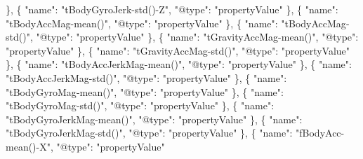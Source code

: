 \documentclass[
]{article}
\newenvironment{Shaded}{\begin{snugshade}}{\end{snugshade}}
\newcommand{\DataTypeTok}[1]{\textcolor[rgb]{0.13,0.29,0.53}{#1}}
\newcommand{\FunctionTok}[1]{\textcolor[rgb]{0.00,0.00,0.00}{#1}}
\newcommand{\OtherTok}[1]{\textcolor[rgb]{0.56,0.35,0.01}{#1}}
\newcommand{\StringTok}[1]{\textcolor[rgb]{0.31,0.60,0.02}{#1}}
\begin{document}
\begin{Shaded}
\begin{Highlighting}[]
    \FunctionTok{\}}\OtherTok{,}
    \FunctionTok{\{}
      \DataTypeTok{"name"}\FunctionTok{:} \StringTok{"tBodyGyroJerk{-}std(){-}Z"}\FunctionTok{,}
      \DataTypeTok{"@type"}\FunctionTok{:} \StringTok{"propertyValue"}
    \FunctionTok{\}}\OtherTok{,}
    \FunctionTok{\{}
      \DataTypeTok{"name"}\FunctionTok{:} \StringTok{"tBodyAccMag{-}mean()"}\FunctionTok{,}
      \DataTypeTok{"@type"}\FunctionTok{:} \StringTok{"propertyValue"}
    \FunctionTok{\}}\OtherTok{,}
    \FunctionTok{\{}
      \DataTypeTok{"name"}\FunctionTok{:} \StringTok{"tBodyAccMag{-}std()"}\FunctionTok{,}
      \DataTypeTok{"@type"}\FunctionTok{:} \StringTok{"propertyValue"}
    \FunctionTok{\}}\OtherTok{,}
    \FunctionTok{\{}
      \DataTypeTok{"name"}\FunctionTok{:} \StringTok{"tGravityAccMag{-}mean()"}\FunctionTok{,}
      \DataTypeTok{"@type"}\FunctionTok{:} \StringTok{"propertyValue"}
    \FunctionTok{\}}\OtherTok{,}
    \FunctionTok{\{}
      \DataTypeTok{"name"}\FunctionTok{:} \StringTok{"tGravityAccMag{-}std()"}\FunctionTok{,}
      \DataTypeTok{"@type"}\FunctionTok{:} \StringTok{"propertyValue"}
    \FunctionTok{\}}\OtherTok{,}
    \FunctionTok{\{}
      \DataTypeTok{"name"}\FunctionTok{:} \StringTok{"tBodyAccJerkMag{-}mean()"}\FunctionTok{,}
      \DataTypeTok{"@type"}\FunctionTok{:} \StringTok{"propertyValue"}
    \FunctionTok{\}}\OtherTok{,}
    \FunctionTok{\{}
      \DataTypeTok{"name"}\FunctionTok{:} \StringTok{"tBodyAccJerkMag{-}std()"}\FunctionTok{,}
      \DataTypeTok{"@type"}\FunctionTok{:} \StringTok{"propertyValue"}
    \FunctionTok{\}}\OtherTok{,}
    \FunctionTok{\{}
      \DataTypeTok{"name"}\FunctionTok{:} \StringTok{"tBodyGyroMag{-}mean()"}\FunctionTok{,}
      \DataTypeTok{"@type"}\FunctionTok{:} \StringTok{"propertyValue"}
    \FunctionTok{\}}\OtherTok{,}
    \FunctionTok{\{}
      \DataTypeTok{"name"}\FunctionTok{:} \StringTok{"tBodyGyroMag{-}std()"}\FunctionTok{,}
      \DataTypeTok{"@type"}\FunctionTok{:} \StringTok{"propertyValue"}
    \FunctionTok{\}}\OtherTok{,}
    \FunctionTok{\{}
      \DataTypeTok{"name"}\FunctionTok{:} \StringTok{"tBodyGyroJerkMag{-}mean()"}\FunctionTok{,}
      \DataTypeTok{"@type"}\FunctionTok{:} \StringTok{"propertyValue"}
    \FunctionTok{\}}\OtherTok{,}
    \FunctionTok{\{}
      \DataTypeTok{"name"}\FunctionTok{:} \StringTok{"tBodyGyroJerkMag{-}std()"}\FunctionTok{,}
      \DataTypeTok{"@type"}\FunctionTok{:} \StringTok{"propertyValue"}
    \FunctionTok{\}}\OtherTok{,}
    \FunctionTok{\{}
      \DataTypeTok{"name"}\FunctionTok{:} \StringTok{"fBodyAcc{-}mean(){-}X"}\FunctionTok{,}
      \DataTypeTok{"@type"}\FunctionTok{:} \StringTok{"propertyValue"}

\end{Highlighting}
\end{Shaded}
\end{document}
